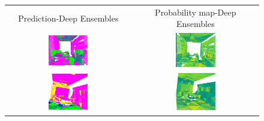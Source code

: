     \begin{figure}[h!]
        \centering
        \begin{tabular}{cc}
            Prediction-Deep Ensembles & Probability map-Deep Ensembles \\
            \includegraphics[width=0.33\textwidth, height=0.18\textheight]{images/seg_output/s3dis_DE/S3DIS_1_Pred.pdf}& 
            \includegraphics[width=0.33\textwidth, height=0.18\textheight]{images/seg_output/s3dis_DE/S3DIS_1_prob.pdf}\\

            \includegraphics[width=0.33\textwidth, height=0.18\textheight]{images/seg_output/s3dis_DE/S3DIS_2_Pred.pdf}& 
            \includegraphics[width=0.33\textwidth, height=0.18\textheight]{images/seg_output/s3dis_DE/S3DIS_2_prob.pdf}\\


\end{tabular}
\end{figure}
